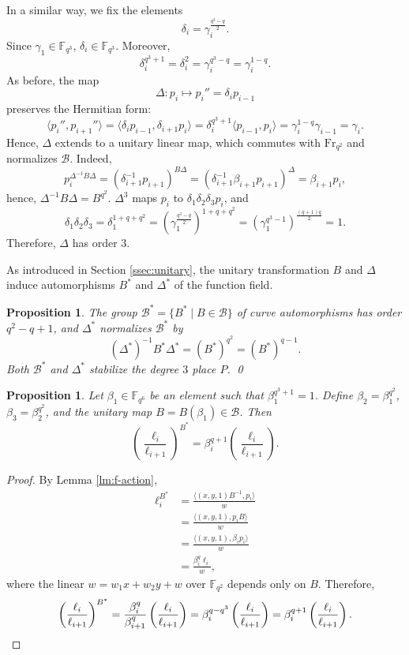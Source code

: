 \documentclass[a4paper]{amsart}
\theoremstyle{plain}
\newtheorem{proposition}[theorem]{Proposition}
\theoremstyle{definition}
\theoremstyle{remark}
\newcommand{\Frob}{{\mathrm{Fr}_{q^2}}}
\begin{document}
In a similar way, we fix the elements 
\[\delta_i=\gamma_i^\frac{q^3-q}{2}.\] %
Since $\gamma_1 \in \mathbb{F}_{q^3}$, $\delta_{i}\in \mathbb{F}_{q^3}$. Moreover,
\[\delta_i^{q^3+1}=\delta_i^2=\gamma_i^{q^3-q}=\gamma_i^{1-q}.\] 
As before, the map 
\[\Delta:p_i\mapsto p_i''=\delta_i p_{i-1}\]
preserves the Hermitian form:
\[\langle p_i'',p_{i+1}'' \rangle = \langle \delta_{i} p_{i-1}, \delta_{i+1} p_{i} \rangle = \delta_{i}^{q^3+1} \langle p_{i-1},p_{i} \rangle = \gamma_i^{1-q} \gamma_{i-1} =\gamma_i.\]
Hence, $\Delta$ extends to a unitary linear map, which commutes with $\Frob$ and normalizes $\mathcal{B}$. Indeed,
\[ p_{i}^{\Delta^{-1}B\Delta} = (\delta_{i+1}^{-1}p_{i+1})^{B\Delta} = (\delta_{i+1}^{-1}\beta_{i+1} p_{i+1})^\Delta = \beta_{i+1} p_i, \]
hence, $\Delta^{-1}B\Delta=B^{q^2}$. $\Delta^3$ maps $p_i$ to $\delta_1\delta_2\delta_3 p_i$, and
\[\delta_1\delta_2\delta_3=\delta_1^{1+q+q^2}=\left(\gamma_1^\frac{q^3-q}{2}\right)^{1+q+q^2}= \left(\gamma_1^{q^3-1}\right)^\frac{(q+1)q}{2}=1.\]
Therefore, $\Delta$ has order $3$. 

As introduced in Section \ref{ssec:unitary}, the unitary transformation $B$ and $\Delta$ induce automorphisms $B^*$ and $\Delta^*$ of the function field. 
\begin{proposition}
The group $\mathcal{B}^* = \{B^* \mid B \in \mathcal{B}\}$ of curve automorphisms has order $q^2-q+1$, and $\Delta^*$ normalizes $\mathcal{B}^*$ by 
\[(\Delta^*)^{-1}B^*\Delta^*=(B^*)^{q^2}=(B^*)^{q-1}.\]
Both $\mathcal{B}^*$ and $\Delta^*$ stabilize the degree $3$ place $P$. \qed
\end{proposition}

\begin{proposition} \label{pr:B-star-elli} 
Let $\beta_1 \in \mathbb{F}_{q^6}$ be an element such that $\beta_1^{q^3+1}=1$. Define $\beta_2=\beta_1^{q^2}$, $\beta_3=\beta_2^{q^2}$, and the unitary map $B=B(\beta_1) \in \mathcal{B}$. Then 
\[\left(\frac{\ell_i}{\ell_{i+1}}\right)^{B^*} = \beta_i^{q+1}\left(\frac{\ell_i}{\ell_{i+1}}\right).\]
\end{proposition}
\begin{proof}
By Lemma \ref{lm:f-action},
\begin{align*}
\ell_i^{B^*} & = \frac{\langle (x,y,1)B^{-1}, p_i \rangle }{w} \\
&= \frac{\langle (x,y,1), p_i B \rangle }{w} \\
&= \frac{\langle (x,y,1), \beta_i p_i \rangle }{w} \\
&= \frac{\beta_i^q \ell_i}{w},
\end{align*}
where the linear $w=w_1x+w_2y+w$ over $\mathbb{F}_{q^2}$ depends only on $B$. Therefore,
\[\left(\frac{\ell_i}{\ell_{i+1}}\right)^{B^*} = \frac{\beta_i^q}{\beta_{i+1}^q}\left(\frac{\ell_i}{\ell_{i+1}}\right) = \beta_i^{q-q^3}\left(\frac{\ell_i}{\ell_{i+1}}\right) = \beta_i^{q+1}\left(\frac{\ell_i}{\ell_{i+1}}\right). \qedhere\]
\end{proof}
\end{document}
